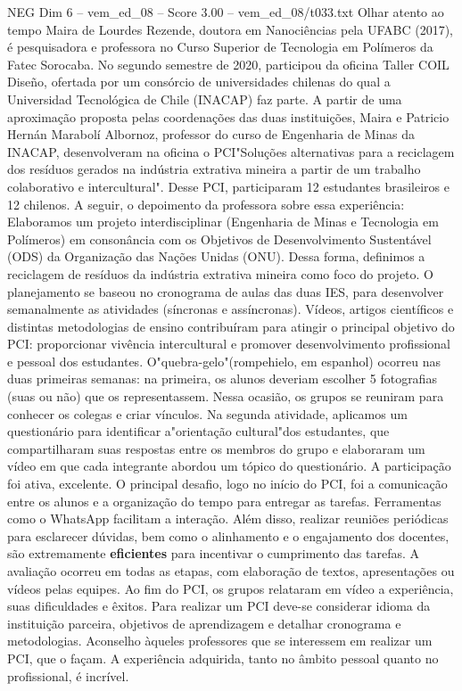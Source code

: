 \begin{textsample}{NEG Dim 6 – vem\_ed\_08 – Score 3.00 – vem\_ed\_08/t033.txt}  \label{ex:f6_neg_100}
Olhar atento ao tempo Maira de Lourdes Rezende, doutora em Nanociências pela UFABC (2017), é pesquisadora e professora no Curso Superior de Tecnologia em Polímeros da Fatec Sorocaba.
No segundo semestre de 2020, participou da oficina Taller COIL Diseño, ofertada por um consórcio de universidades chilenas do qual a Universidad Tecnológica de Chile (INACAP) faz parte.
A partir de uma aproximação proposta pelas coordenações das duas instituições, Maira e Patricio Hernán Marabolí Albornoz, professor do curso de Engenharia de Minas da INACAP, desenvolveram na oficina o PCI"Soluções alternativas para a reciclagem dos resíduos gerados na indústria extrativa mineira a partir de um trabalho colaborativo e intercultural".
Desse PCI, participaram 12 estudantes brasileiros e 12 chilenos.
A seguir, o depoimento da professora sobre essa experiência: Elaboramos um projeto interdisciplinar (Engenharia de Minas e Tecnologia em Polímeros) em consonância com os Objetivos de Desenvolvimento Sustentável (ODS) da Organização das Nações Unidas (ONU).
Dessa forma, definimos a reciclagem de resíduos da indústria extrativa mineira como foco do projeto.
O planejamento se baseou no cronograma de aulas das duas IES, para desenvolver semanalmente as atividades (síncronas e assíncronas).
Vídeos, artigos científicos e distintas metodologias de ensino contribuíram para atingir o principal objetivo do PCI: proporcionar vivência intercultural e promover desenvolvimento profissional e pessoal dos estudantes.
O"quebra-gelo"(rompehielo, em espanhol) ocorreu nas duas primeiras semanas: na primeira, os alunos deveriam escolher 5 fotografias (suas ou não) que os representassem.
Nessa ocasião, os grupos se reuniram para conhecer os colegas e criar vínculos.
Na segunda atividade, aplicamos um questionário para identificar a"orientação cultural"dos estudantes, que compartilharam suas respostas entre os membros do grupo e elaboraram um vídeo em que cada integrante abordou um tópico do questionário.
A participação foi ativa, excelente.
O principal desafio, logo no início do PCI, foi a comunicação entre os alunos e a organização do tempo para entregar as tarefas.
Ferramentas como o WhatsApp facilitam a interação.
Além disso, realizar reuniões periódicas para esclarecer dúvidas, bem como o alinhamento e o engajamento dos docentes, são extremamente \textbf{eficientes} para incentivar o cumprimento das tarefas.
A avaliação ocorreu em todas as etapas, com elaboração de textos, apresentações ou vídeos pelas equipes.
Ao fim do PCI, os grupos relataram em vídeo a experiência, suas dificuldades e êxitos.
Para realizar um PCI deve-se considerar idioma da instituição parceira, objetivos de aprendizagem e detalhar cronograma e metodologias.
Aconselho àqueles professores que se interessem em realizar um PCI, que o façam.
A experiência adquirida, tanto no âmbito pessoal quanto no profissional, é incrível.

\end{textsample}
